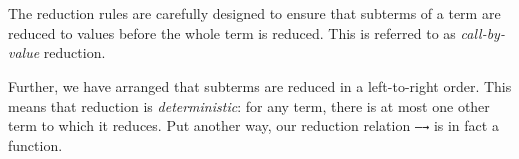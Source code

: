 \begin{fence}
\begin{code}
\AgdaSpace{}%
\AgdaSymbol{\}}\<%
\\
\>[2][@{}l@{\AgdaIndent{0}}]%
\>[4]%
\>[720I]\AgdaSpace{}%
\<%
\\
\>[.][@{}l@{}]\<[720I]%
\>[6]\AgdaComment{---------------------------------------------------}\<%
\\
%
\>[4]\AgdaSpace{}%
\AgdaSpace{}%
\AgdaSpace{}%
\AgdaSpace{}%
\AgdaOperator{\AgdaInductiveConstructor{[zero⇒}}\AgdaSpace{}%
\AgdaSpace{}%
\AgdaSpace{}%
\AgdaSpace{}%
\AgdaSpace{}%
\AgdaSpace{}%
\AgdaOperator{\AgdaInductiveConstructor{]}}\AgdaSpace{}%
\AgdaSpace{}%
\AgdaSpace{}%
\AgdaOperator{\AgdaFunction{[}}\AgdaSpace{}%
\AgdaSpace{}%
\AgdaOperator{\AgdaFunction{:=}}\AgdaSpace{}%
\AgdaSpace{}%
\AgdaOperator{\AgdaFunction{]}}\<%
\\
%
\\[\AgdaEmptyExtraSkip]%
%
\>[2]%
\>[739I]\AgdaSymbol{:}\AgdaSpace{}%
\AgdaSpace{}%
\AgdaSymbol{\{}\AgdaSpace{}%
\AgdaSymbol{\}}\<%
\\
\>[.][@{}l@{}]\<[739I]%
\>[6]\AgdaComment{------------------------------}\<%
\\
\>[2][@{}l@{\AgdaIndent{0}}]%
\>[4]\AgdaSpace{}%
\AgdaSpace{}%
\AgdaSpace{}%
\AgdaSpace{}%
\AgdaSpace{}%
\AgdaSpace{}%
\AgdaSpace{}%
\AgdaOperator{\AgdaFunction{[}}\AgdaSpace{}%
\AgdaSpace{}%
\AgdaOperator{\AgdaFunction{:=}}\AgdaSpace{}%
\AgdaSpace{}%
\AgdaSpace{}%
\AgdaSpace{}%
\AgdaSpace{}%
\AgdaOperator{\AgdaFunction{]}}\<%
\end{code}
\end{fence}

The reduction rules are carefully designed to ensure that subterms of a
term are reduced to values before the whole term is reduced. This is
referred to as \emph{call-by-value} reduction.

Further, we have arranged that subterms are reduced in a left-to-right
order. This means that reduction is \emph{deterministic}: for any term,
there is at most one other term to which it reduces. Put another way,
our reduction relation \texttt{—→} is in fact a function.

